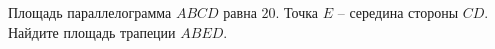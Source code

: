\begin{ex}
	\begin{condition}
		Площадь параллелограмма \( ABCD \) равна \(20\). Точка \( E \) – середина стороны \(CD\). Найдите площадь трапеции \(ABED\).
	\end{condition}
\end{ex}